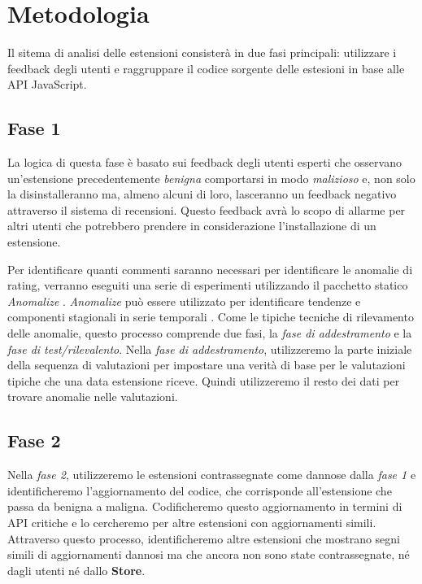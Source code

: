 \documentclass[ 11pt, oneside, italian, onehalfspacing, headsepline, ]{MastersDoctoralThesis}
\begin{document}
{\chapter{Metodologia}}

Il sitema di analisi delle estensioni consisterà in due fasi principali: utilizzare i feedback degli utenti e raggruppare il codice sorgente delle estesioni in base alle API JavaScript.

{\section{Fase 1}}

La logica di questa fase è basato sui feedback degli utenti esperti che osservano un'estensione precedentemente  \textit{benigna} comportarsi in modo  \textit{malizioso} e, non solo la disinstalleranno ma, almeno alcuni di loro, lasceranno un feedback negativo attraverso il sistema di recensioni. Questo feedback avrà lo scopo di allarme per altri utenti che potrebbero prendere in considerazione l'installazione di un estensione. \par

Per identificare quanti commenti saranno necessari per identificare le anomalie di rating, verranno eseguiti una serie di esperimenti utilizzando il pacchetto statico \textit{Anomalize} \citep{Anomalize}. \textit{Anomalize} può essere utilizzato per identificare tendenze e componenti stagionali in serie temporali \citep{GeneralizedExtremeStudentized}. Come le tipiche tecniche di rilevamento delle anomalie, questo processo comprende due fasi, la \textit{fase di addestramento} e la \textit{fase di test/rilevalento}. Nella \textit{fase di addestramento}, utilizzeremo la parte iniziale della sequenza di valutazioni per impostare una verità di base per le valutazioni tipiche che una data estensione riceve. Quindi utilizzeremo il resto dei dati per trovare anomalie nelle valutazioni.

{\section{Fase 2}}

Nella \textit{fase 2}, utilizzeremo le estensioni contrassegnate come dannose dalla \textit{fase 1} e identificheremo l'aggiornamento del codice, che corrisponde all'estensione che passa da benigna a maligna. Codificheremo questo aggiornamento  in termini di API critiche e lo cercheremo per altre estensioni con aggiornamenti simili. Attraverso questo processo, identificheremo altre estensioni che mostrano segni simili di aggiornamenti dannosi ma che ancora non sono state contrassegnate, né dagli utenti né dallo \textbf{Store}.
\end{document}
